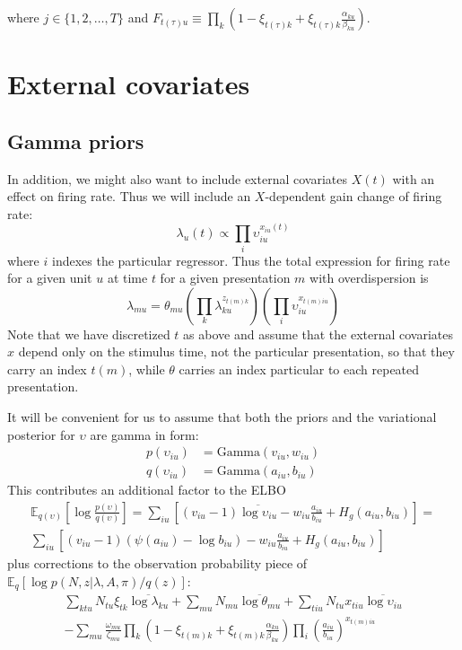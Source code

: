 \documentclass[11pt]{article}
\begin{document}
where $j \in \{1, 2, \ldots, T \}$ and $F_{t(\tau)u} \equiv \prod_k \left( 1 - \xi_{t(\tau)k} + \xi_{t(\tau)k} \frac{\alpha_{ku}}{\beta_{ku}} \right)$.

\section{External covariates}
\subsection{Gamma priors}
In addition, we might also want to include external covariates $X(t)$ with an effect on firing rate. Thus we will include an $X$-dependent gain change of firing rate:
\begin{equation}
    \lambda_{u}(t) \propto \prod_i \upsilon_{iu}^{x_{iu}(t)}
\end{equation}
where $i$ indexes the particular regressor. Thus the total expression for firing rate for a given unit $u$ at time $t$ for a given presentation $m$ with overdispersion is
\begin{equation}
    \lambda_{mu} = \theta_{mu}\left(\prod_k \lambda_{ku}^{z_{t(m)k}} \right) \left(\prod_i \upsilon_{iu}^{x_{t(m)iu}} \right)
\end{equation}
Note that we have discretized $t$ as above and assume that the external covariates $x$ depend only on the stimulus time, not the particular presentation, so that they carry an index $t(m)$, while $\theta$ carries an index particular to each repeated presentation.

It will be convenient for us to assume that both the priors and the variational posterior for $\upsilon$ are gamma in form:
\begin{align}
    p(\upsilon_{iu}) &= \mathrm{Gamma}(v_{iu}, w_{iu}) \\
    q(\upsilon_{iu}) &= \mathrm{Gamma}(a_{iu}, b_{iu})
\end{align}
This contributes an additional factor to the ELBO
\begin{multline}
    \mathbb{E}_{q(\upsilon)} \left[ \log \frac{p(\upsilon)}{q(\upsilon)} \right] =
    \sum_{iu} \left[ (v_{iu} - 1) \overline{\log \upsilon_{iu}} - w_{iu} \frac{a_{iu}}{b_{iu}} + H_g(a_{iu}, b_{iu}) \right] =\\
    \sum_{iu} \left[ (v_{iu} - 1) (\psi(a_{iu}) - \log b_{iu}) - w_{iu} \frac{a_{iu}}{b_{iu}} + H_g(a_{iu}, b_{iu}) \right]
\end{multline}
plus corrections to the observation probability piece of $\mathbb{E}_q[\log p(N, z|\lambda, A, \pi) / q(z)]$:
\begin{multline}
    \sum_{ktu} N_{tu} \xi_{tk} \overline{\log \lambda_{ku}} + \sum_{mu} N_{mu} \overline{\log \theta_{mu}} + \sum_{tiu} N_{tu} x_{tiu} \overline{\log \upsilon_{iu}} \\
    - \sum_{mu} \frac{\omega_{mu}}{\zeta_{mu}} \prod_k \left( 1 - \xi_{t(m)k} + \xi_{t(m)k} \frac{\alpha_{ku}}{\beta_{ku}}\right)\prod_i \left(\frac{a_{iu}}{b_{iu}} \right)^{x_{t(m)iu}}
\end{multline}
\end{document}
